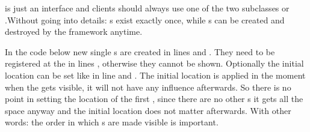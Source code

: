  is just an interface and clients should always use one of the two subclasses  or .Without going into details: s exist exactly once, while \linebreak {}s can be created and destroyed by the framework anytime.

In the code below new single s are created in lines  and . They need to be registered at the  in lines , otherwise they cannot be shown. Optionally the initial location can be set like in line  and . The initial location is applied in the moment when the  gets visible, it will not have any influence afterwards. So there is no point in setting the location of the first , since there are no other s it gets all the space anyway and the initial location does not matter afterwards. With other words: the order in which s are made visible is important.


